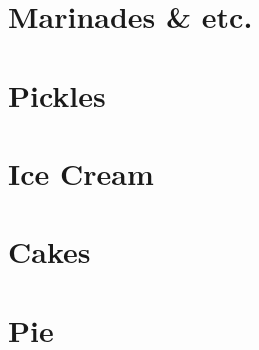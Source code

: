 \documentclass{family_cookbook}
\begin{document}
\chapter{Marinades \& etc.}
\minitoc%
\clearpage







\chapter{Pickles}
\minitoc%
\clearpage

{%
	\let\section\subsection%
	\let\subsection\subsubsection%
	
	
	
}


\chapter{Ice Cream}
\minitoc%
\clearpage



\chapter{Cakes}
\minitoc%
\clearpage









%





\chapter{Pie}
\minitoc%
\clearpage






\clearpage
{}
\raggedright%
\printbibliography%

\clearpage
\printindex

\printglossary[type=\acronymtype]
\end{document}
